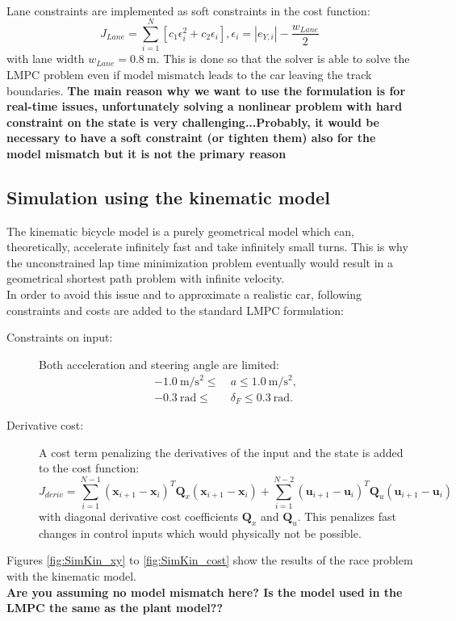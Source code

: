 \\Lane constraints are implemented as soft constraints in the cost function: %
\begin{equation}\label{eq:softLaneConstraints}
J_{Lane} = \sum_{i=1}^N [c_1\epsilon_i^2 + c_2\epsilon_i], \epsilon_i = |e_{Y,i}|-\frac{w_{Lane}}{2}
\end{equation}
with lane width $w_{Lane}=\SI{0.8}{\meter}$. This is done so that the solver is able to solve the LMPC problem even if model mismatch leads to the car leaving the track boundaries. {\bfseries{The main reason why we want to use the formulation is for real-time issues, unfortunately solving a nonlinear problem with hard constraint on the state is very challenging...Probably, it would be necessary to have a soft constraint (or tighten them) also for the model mismatch but it is not the primary reason}}
\subsection{Simulation using the kinematic model}
The kinematic bicycle model is a purely geometrical model which can, theoretically, accelerate infinitely fast and take infinitely small turns. This is why the unconstrained lap time minimization problem eventually would result in a geometrical shortest path problem with infinite velocity.\\
In order to avoid this issue and to approximate a realistic car, following constraints and costs are added to the standard LMPC formulation:
\begin{description}
\item[Constraints on input:] Both acceleration and steering angle are limited:
\begin{align*}
-\SI{1.0}{\meter\per\square\second} \leq\  &a \leq \SI{1.0}{\meter\per\square\second},\\
-\SI{0.3}{\radian} \leq\ &\delta_F \leq \SI{0.3}{\radian}.
\end{align*}
\item[Derivative cost:] A cost term penalizing the derivatives of the input and the state is added to the cost function:
\begin{equation}
J_{deriv} = \sum_{i=1}^{N-1} (\bm{x}_{i+1}-\bm{x}_i)^T \bm{Q}_x (\bm{x}_{i+1}-\bm{x}_i)+\sum_{i=1}^{N-2} (\bm{u}_{i+1}-\bm{u}_i)^T \bm{Q}_u (\bm{u}_{i+1}-\bm{u}_i)
\end{equation}
with diagonal derivative cost coefficients $\bm{Q}_x$ and $\bm{Q}_u$. This penalizes fast changes in control inputs which would physically not be possible.
\end{description}
Figures \ref{fig:SimKin_xy} to \ref{fig:SimKin_cost} show the results of the race problem with the kinematic model.\\
{\bfseries{Are you assuming no model mismatch here? Is the model used in the LMPC the same as the plant model??}}
